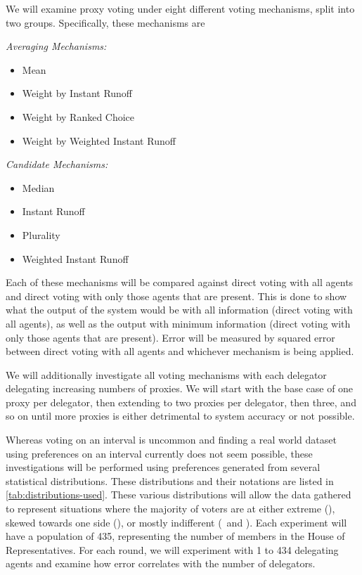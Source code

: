 We will examine proxy voting under eight different voting mechanisms, split into two
groups.
Specifically, these mechanisms are\\
\begin{samepage}
    \textit{Averaging Mechanisms:}
    \begin{itemize}
        \item Mean
        \item Weight by Instant Runoff
        \item Weight by Ranked Choice
        \item Weight by Weighted Instant Runoff
    \end{itemize}
    \textit{Candidate Mechanisms:}
    \begin{itemize}
        \item Median
        \item Instant Runoff
        \item Plurality
        \item Weighted Instant Runoff
    \end{itemize}
\end{samepage}
Each of these mechanisms will be compared against direct voting with all agents and
direct voting with only those agents that are present.
This is done to show what the output of the system would be with all information
(direct voting with all agents), as well as the output with minimum information
(direct voting with only those agents that are present).
Error will be measured by squared error between direct voting with all agents and
whichever mechanism is being applied.

We will additionally investigate all voting mechanisms with each delegator delegating
increasing numbers of proxies.
We will start with the base case of one proxy per delegator, then extending to two
proxies per delegator, then three, and so on until more proxies is either detrimental
to system accuracy or not possible.

Whereas voting on an interval is uncommon and finding a real world dataset using
preferences on an interval currently does not seem possible, these investigations
will be performed using preferences generated from several statistical distributions.
These distributions and their notations are listed in \autoref{tab:distributions-used}.
These various distributions will allow the data gathered to represent situations
where the majority of voters are at either extreme (),
skewed towards one side (), or mostly indifferent
(\gaussiandist\ and ).
Each experiment will have a population of 435, representing the number of members in
the House of Representatives.
For each round, we will experiment with 1 to 434 delegating agents and examine how
error correlates with the number of delegators.

